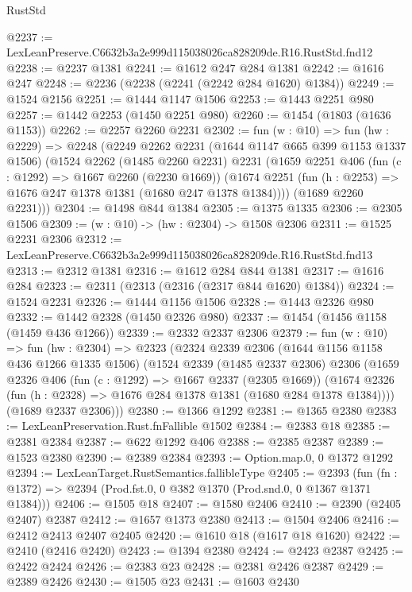 \begin{lexlean}{RustStd}
\begin{coremodule}
@2237 := LexLeanPreserve.C6632b3a2e999d115038026ca828209de.R16.RustStd.fnd12
@2238 := @2237 @1381
@2241 := @1612 @247 @284 @1381
@2242 := @1616 @247
@2248 := @2236 (@2238 (@2241 (@2242 @284 @1620) @1384))
@2249 := @1524 @2156
@2251 := @1444 @1147 @1506
@2253 := @1443 @2251 @980
@2257 := @1442 @2253 (@1450 @2251 @980)
@2260 := @1454 (@1803 (@1636 @1153))
@2262 := @2257 @2260 @2231
@2302 := fun (w : @10) =>
  fun (hw : @2229) =>
  @2248
    (@2249
      @2262
      @2231
      (@1644 @1147 @665 @399 @1153 @1337 @1506)
      (@1524
        @2262
        (@1485 @2260 @2231)
        @2231
        (@1659
          @2251
          @406
          (fun (c : @1292) => @1667 @2260 (@2230 @1669))
          (@1674 @2251 (fun (h : @2253) => @1676 @247 @1378 @1381 (@1680 @247 @1378 @1384))))
        (@1689 @2260 @2231)))
@2304 := @1498 @844 @1384
@2305 := @1375 @1335
@2306 := @2305 @1506
@2309 := (w : @10) -> (hw : @2304) -> @1508 @2306
@2311 := @1525 @2231 @2306
@2312 := LexLeanPreserve.C6632b3a2e999d115038026ca828209de.R16.RustStd.fnd13
@2313 := @2312 @1381
@2316 := @1612 @284 @844 @1381
@2317 := @1616 @284
@2323 := @2311 (@2313 (@2316 (@2317 @844 @1620) @1384))
@2324 := @1524 @2231
@2326 := @1444 @1156 @1506
@2328 := @1443 @2326 @980
@2332 := @1442 @2328 (@1450 @2326 @980)
@2337 := @1454 (@1456 @1158 (@1459 @436 @1266))
@2339 := @2332 @2337 @2306
@2379 := fun (w : @10) =>
  fun (hw : @2304) =>
  @2323
    (@2324
      @2339
      @2306
      (@1644 @1156 @1158 @436 @1266 @1335 @1506)
      (@1524
        @2339
        (@1485 @2337 @2306)
        @2306
        (@1659
          @2326
          @406
          (fun (c : @1292) => @1667 @2337 (@2305 @1669))
          (@1674 @2326 (fun (h : @2328) => @1676 @284 @1378 @1381 (@1680 @284 @1378 @1384))))
        (@1689 @2337 @2306)))
@2380 := @1366 @1292
@2381 := @1365 @2380
@2383 := LexLeanPreservation.Rust.fnFallible @1502
@2384 := @2383 @18
@2385 := @2381 @2384
@2387 := @622 @1292 @406
@2388 := @2385 @2387
@2389 := @1523 @2380
@2390 := @2389 @2384
@2393 := Option.map.{0, 0} @1372 @1292
@2394 := LexLeanTarget.RustSemantics.fallibleType
@2405 := @2393
    (fun (fn : @1372) => @2394 (Prod.fst.{0, 0} @382 @1370 (Prod.snd.{0, 0} @1367 @1371 @1384)))
@2406 := @1505 @18
@2407 := @1580 @2406
@2410 := @2390 (@2405 @2407) @2387
@2412 := @1657 @1373 @2380
@2413 := @1504 @2406
@2416 := @2412 @2413 @2407 @2405
@2420 := @1610 @18 (@1617 @18 @1620)
@2422 := @2410 (@2416 @2420)
@2423 := @1394 @2380
@2424 := @2423 @2387
@2425 := @2422 @2424
@2426 := @2383 @23
@2428 := @2381 @2426 @2387
@2429 := @2389 @2426
@2430 := @1505 @23
@2431 := @1603 @2430

\end{coremodule}
\end{lexlean}
